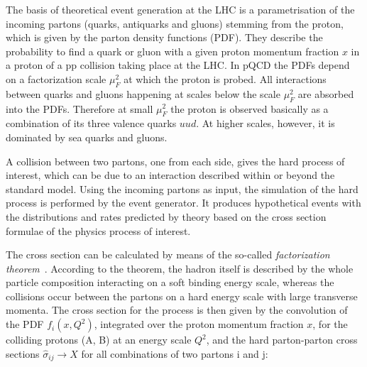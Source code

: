 The basis of theoretical event generation at the LHC is a parametrisation of the incoming partons (quarks, antiquarks and gluons) stemming from the proton, which is given by the parton density functions (PDF).
They describe the probability to find a quark or gluon with a given proton momentum fraction $x$ in a proton of a pp collision taking place at the LHC.
In pQCD the PDFs depend on a factorization scale $\mu^2_F$ at which the proton is probed.
All interactions between quarks and gluons happening at scales below the scale $\mu^2_F$ are absorbed into the PDFs. Therefore at small $\mu^2_F$ the proton is observed basically as a combination of its
three valence quarks $uud$. At higher scales, however, it is dominated by sea quarks and gluons.

A collision between two partons, one from each side, gives the hard process of interest, which can be due to an interaction described within or beyond the standard model.
Using the incoming partons as input, the simulation of the hard process is performed by the event generator.
It produces hypothetical events with the distributions and rates predicted by theory based on the cross section formulae of the physics process of interest.

The cross section can be calculated by means of the so-called \textit{factorization theorem}~\cite{Collins:1987pm}.
According to the theorem, the hadron itself is described by the whole particle composition interacting on a soft binding energy scale,
whereas the collisions occur between the partons on a hard energy scale with large transverse momenta.
The cross section for the process is then given by the convolution of the PDF $f_i(x,Q^2)$, integrated over the proton momentum fraction $x$, for the colliding protons (A, B) at an energy scale $Q^2$,
and the hard parton-parton cross sections $\hat{\sigma}_{ij} \to X$ for all combinations of two partons i and j:

